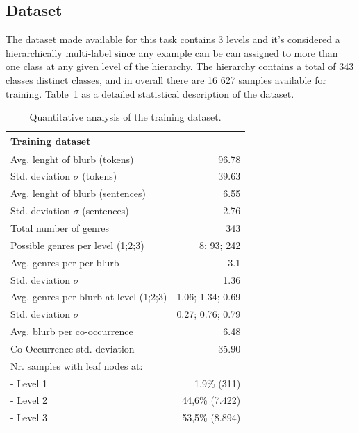 \documentclass[11pt,a4paper]{article}
\begin{document}
\subsection{Dataset}

The dataset made available for this task contains 3 levels and it's considered a hierarchically
multi-label since any example can be can assigned to more than one class at any given level of
the hierarchy. The hierarchy contains a total of 343 classes distinct classes, and in overall there
are 16 627 samples available for training. Table~\ref{quantitivy-analysis-train} as a detailed statistical
description of the dataset.



\begin{table}
\small
\begin{center}
\begin{tabular}{|l|r|}
\hline\centering\textbf{Training dataset}  &                    \\
\hline
Avg. lenght of blurb (tokens)              &  96.78             \\
Std. deviation $\sigma$ (tokens)           &  39.63             \\
Avg. lenght of blurb (sentences)           &  6.55              \\
Std. deviation $\sigma$ (sentences)        &  2.76              \\
\hline
Total number of genres                     &  343               \\
Possible genres per level (1;2;3)          &  8; 93; 242        \\
Avg. genres per per blurb                  &  3.1               \\
Std. deviation $\sigma$                    &  1.36              \\
Avg. genres per blurb at level (1;2;3)     &  1.06; 1.34; 0.69  \\
Std. deviation $\sigma$                    &  0.27; 0.76; 0.79  \\
\hline
Avg. blurb per co-occurrence               &  6.48              \\
Co-Occurrence std. deviation               & 35.90              \\
\hline
Nr. samples with leaf nodes at:            &                    \\
 - Level 1                                 & 1.9\% (311)        \\
 - Level 2                                 & 44,6\% (7.422)     \\
 - Level 3                                 & 53,5\% (8.894)     \\
\hline
\end{tabular}
\end{center}
\caption{\label{quantitivy-analysis-train}Quantitative analysis of the training dataset.}
\end{table}
\end{document}
